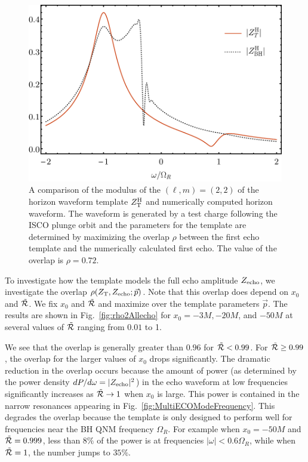 \begin{refsection}
\begin{figure}[t]
\includegraphics[width = 1 \columnwidth]{chapter_echo/etc/horizonmatchV2}
\caption{A comparison of the modulus of the $(\ell, m) =(2,2)$ of the horizon waveform template $Z_{\rm T}^{\rm H}$ and numerically computed horizon waveform. The waveform is generated by a test charge following the ISCO plunge orbit and the parameters for the template are determined by maximizing the overlap $\rho$ between the first echo template and the numerically calculated first echo. The value of the overlap is $\rho=0.72$.
}
\label{fig:horizonmatch}
\end{figure}


To investigate how the template models the full echo amplitude $Z_{\rm echo}$, we investigate the overlap $\rho(Z_{\rm T},Z_{\rm echo};\vec p)$.
Note that this overlap does depend on $x_0$ and $\tilde{\mathcal R}$.
We fix $x_0$ and $\tilde{\mathcal R}$ and maximize over the template parameters $\vec p$. 
The results are shown in Fig.~\ref{fig:rho2Allecho} for $x_0= -3M, -20M$, and $-50M$ at several values of $\tilde{\mathcal R}$
ranging from $0.01$ to 1. 

We see that the overlap is generally greater than $0.96$ for $\tilde{\mathcal R}<0.99$. 
For $\tilde{\mathcal R}\geq 0.99$, the overlap for the larger values of $x_0$ drops significantly. 
The dramatic reduction in the overlap occurs because the amount of power (as determined by the power density $dP/d\omega=|Z_{\rm echo}|^2$) in the echo waveform at low frequencies significantly increases as $\tilde{\mathcal R}\to 1$ when $x_0$ is large.
This power is contained in the narrow resonances appearing in Fig.~\ref{fig:MultiECOModeFrequency}. 
This degrades the overlap because the template is only designed to perform well for frequencies near the BH QNM frequency $\Omega_R$. 
For example when $x_0 =-50M$ and $\tilde{\mathcal R}=0.999$, less than $8\%$ of the power is at frequencies $|\omega | < 0.6\Omega_R$, while when $\tilde{\mathcal R}=1$, the number jumps to $35\%$.


\end{refsection}

